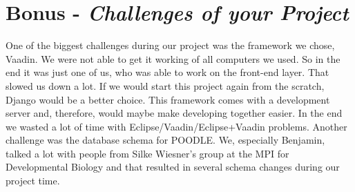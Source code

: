 \documentclass[%
   10pt,              %
   ngerman,           %
   a4paper,           %
   DIV11,             %
]{scrartcl}%
\begin{document}
\section*{Bonus - \textit{Challenges of your Project}}

One of the biggest challenges during our project was the framework we chose, Vaadin. We were not able 
to get it working of all computers we used. So in the end it was just one of us, who was able to work 
on the front-end layer. That slowed us down a lot. If we would start this project again from the scratch, 
Django would be a better choice. This framework comes with a development server and, therefore, would 
maybe make developing together easier. In the end we wasted a lot of time with Eclipse/Vaadin/Eclipse+Vaadin 
problems. Another challenge was the database schema for POODLE. We, especially Benjamin, talked a lot 
with people from Silke Wiesner's group at the MPI for Developmental Biology and that resulted in 
several schema changes during our project time.
\end{document}
